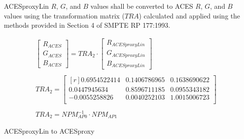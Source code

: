 ACESproxyLin $R$, $G$, and $B$ values shall be converted to ACES $R$, $G$, and $B$ values using the transformation matrix ($TRA$) calculated and applied using the methods provided in Section 4 of SMPTE RP 177:1993.


\begin{floatequ} 
\begin{gather}
    \begin{bmatrix}
        R_{ACES}\\
        G_{ACES}\\
        B_{ACES}
    \end{bmatrix}
    =
    TRA_{2}
    \cdot
    \begin{bmatrix}
        R_{ACESproxyLin}\\
        G_{ACESproxyLin}\\
        B_{ACESproxyLin}
    \end{bmatrix} \\
    \\
    TRA_{2} =
    \begin{bmatrix*}[r]
        0.6954522414 & 0.1406786965 & 0.1638690622 \\
        0.0447945634 & 0.8596711185 & 0.0955343182 \\
        -0.0055258826 & 0.0040252103 & 1.0015006723 \\
    \end{bmatrix*} \\
    \\
    TRA_{2} = NPM^{-1}_{AP0} \cdot NPM_{AP1}
\end{gather}
\caption{ACESproxyLin to ACESproxy}
\label{eq:ACESproxyLin2ACES12}
\end{floatequ}